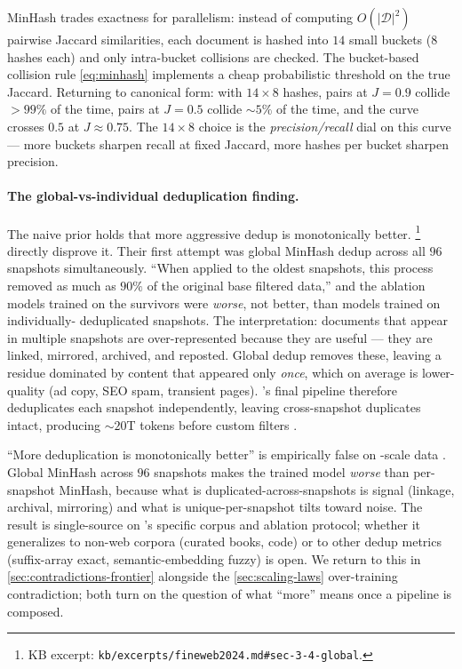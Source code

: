 \begin{intuition}
\label{intuit:minhash}
MinHash trades exactness for parallelism: instead of computing
$O(|\mathcal{D}|^2)$ pairwise Jaccard similarities, each document is
hashed into $14$ small buckets (8 hashes each) and only intra-bucket
collisions are checked. The bucket-based collision rule
\cref{eq:minhash} implements a cheap probabilistic threshold on the
true Jaccard. Returning to canonical form: with $14 \times 8$
hashes, pairs at $J = 0.9$ collide $> 99\%$ of the time, pairs at
$J = 0.5$ collide $\sim 5\%$ of the time, and the curve crosses $0.5$
at $J \approx 0.75$. The $14 \times 8$ choice is the
\emph{precision/recall} dial on this curve --- more buckets sharpen
recall at fixed Jaccard, more hashes per bucket sharpen precision.
\end{intuition}

\paragraph{The global-vs-individual deduplication finding.}
The naive prior holds that more aggressive dedup is monotonically
better. \citet[\S 3.4]{fineweb2024}\footnote{KB excerpt:
\nolinkurl{kb/excerpts/fineweb2024.md#sec-3-4-global}.} directly
disprove it. Their first attempt was global MinHash dedup across all
$96$ snapshots simultaneously. ``When applied to the oldest
snapshots, this process removed as much as $90\%$ of the original
base filtered data,'' and the ablation models trained on the survivors
were \emph{worse}, not better, than models trained on individually-
deduplicated snapshots. The interpretation: documents that appear in
multiple snapshots are over-represented because they are useful ---
they are linked, mirrored, archived, and reposted. Global dedup
removes these, leaving a residue dominated by content that appeared
only \emph{once}, which on average is lower-quality (ad copy, SEO
spam, transient pages). 's final pipeline therefore
deduplicates each snapshot independently, leaving cross-snapshot
duplicates intact, producing $\sim 20$T tokens before custom filters
\citep[\S 3.4]{fineweb2024}.

\begin{contradiction}
\label{contra:global-vs-indiv-dedup}
``More deduplication is monotonically better'' is empirically false
on -scale data \citep[\S 3.4]{fineweb2024}. Global MinHash
across $96$  snapshots makes the trained model
\emph{worse} than per-snapshot MinHash, because what is
duplicated-across-snapshots is signal (linkage, archival, mirroring)
and what is unique-per-snapshot tilts toward noise. The result is
single-source on 's specific corpus and ablation protocol;
whether it generalizes to non-web corpora (curated books, code) or
to other dedup metrics (suffix-array exact, semantic-embedding
fuzzy) is open. We return to this in
\cref{sec:contradictions-frontier} alongside the
\cref{sec:scaling-laws} over-training contradiction; both turn on
the question of what ``more'' means once a pipeline is composed.
\end{contradiction}

